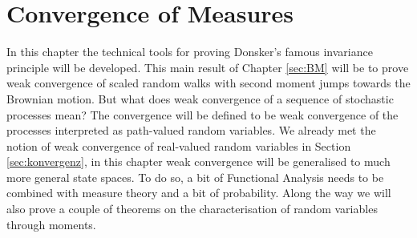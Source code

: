 \chapter{Convergence of Measures}
	\marginpar{\textcolor{red}{Lecture 11}}
In this chapter the technical tools for proving Donsker's famous invariance principle will be developed. This main result of Chapter \ref{sec:BM} will be to prove weak convergence of scaled random walks with second moment jumps towards the Brownian motion. But what does weak convergence of a sequence of stochastic processes mean? The convergence will be defined to be weak convergence of the processes interpreted as path-valued random variables. We already met the notion of weak convergence of real-valued random variables in Section \ref{sec:konvergenz}, in this chapter weak convergence will be generalised to much more general state spaces. To do so, a bit of Functional Analysis needs to be combined with measure theory and a bit of probability. Along the way we will also prove a couple of theorems on the characterisation of random variables through moments. 


